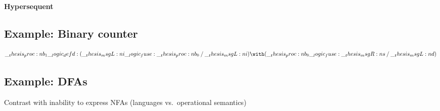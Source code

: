 \paragraph{Hypersequent}



\subsection{Example: Binary counter}

\begin{equation*}
  \proc{b_1} \defd (\msgL{i} \fuse \proc{b_0} \pmir \msgL{i}) \with (\proc{b_0} \fuse \msgR{s} \pmir \msgL{d})
\end{equation*}

\subsection{Example: \Aclp*{DFA}}

Contrast with inability to express \acp{NFA} (languages vs.\ operational semantics)

